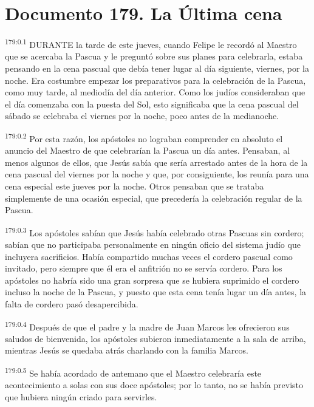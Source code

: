 \chapter{Documento 179. La Última cena}
\par 
\textsuperscript{179:0.1} DURANTE la tarde de este jueves, cuando Felipe le recordó al Maestro que se acercaba la Pascua y le preguntó sobre sus planes para celebrarla, estaba pensando en la cena pascual que debía tener lugar al día siguiente, viernes, por la noche. Era costumbre empezar los preparativos para la celebración de la Pascua, como muy tarde, al mediodía del día anterior. Como los judíos consideraban que el día comenzaba con la puesta del Sol, esto significaba que la cena pascual del sábado se celebraba el viernes por la noche, poco antes de la medianoche.

\par 
\textsuperscript{179:0.2} Por esta razón, los apóstoles no lograban comprender en absoluto el anuncio del Maestro de que celebrarían la Pascua un día antes. Pensaban, al menos algunos de ellos, que Jesús sabía que sería arrestado antes de la hora de la cena pascual del viernes por la noche y que, por consiguiente, los reunía para una cena especial este jueves por la noche. Otros pensaban que se trataba simplemente de una ocasión especial, que precedería la celebración regular de la Pascua.

\par 
\textsuperscript{179:0.3} Los apóstoles sabían que Jesús había celebrado otras Pascuas sin cordero; sabían que no participaba personalmente en ningún oficio del sistema judío que incluyera sacrificios. Había compartido muchas veces el cordero pascual como invitado, pero siempre que él era el anfitrión no se servía cordero. Para los apóstoles no habría sido una gran sorpresa que se hubiera suprimido el cordero incluso la noche de la Pascua, y puesto que esta cena tenía lugar un día antes, la falta de cordero pasó desapercibida.

\par 
\textsuperscript{179:0.4} Después de que el padre y la madre de Juan Marcos les ofrecieron sus saludos de bienvenida, los apóstoles subieron inmediatamente a la sala de arriba, mientras Jesús se quedaba atrás charlando con la familia Marcos.

\par 
\textsuperscript{179:0.5} Se había acordado de antemano que el Maestro celebraría este acontecimiento a solas con sus doce apóstoles; por lo tanto, no se había previsto que hubiera ningún criado para servirles.

